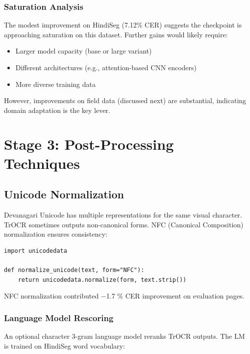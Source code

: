 \documentclass[14pt,a4paper]{article}
\begin{document}
\subsubsection{Saturation Analysis}

The modest improvement on HindiSeg (7.12\% CER) suggests the checkpoint is approaching saturation on this dataset. Further gains would likely require:
\begin{itemize}
    \item Larger model capacity (base or large variant)
    \item Different architectures (e.g., attention-based CNN encoders)
    \item More diverse training data
\end{itemize}

However, improvements on field data (discussed next) are substantial, indicating domain adaptation is the key lever.
\newpage
\section{Stage 3: Post-Processing Techniques}

\subsection{Unicode Normalization}

Devanagari Unicode has multiple representations for the same visual character. TrOCR sometimes outputs non-canonical forms. NFC (Canonical Composition) normalization ensures consistency:

\begin{lstlisting}[caption=Unicode normalization]
import unicodedata

def normalize_unicode(text, form="NFC"):
    return unicodedata.normalize(form, text.strip())
\end{lstlisting}

NFC normalization contributed $-$1.7 \% CER improvement on evaluation pages.

\subsubsection{Language Model Rescoring}

An optional character 3-gram language model reranks TrOCR outputs. The LM is trained on HindiSeg word vocabulary:
\end{document}
